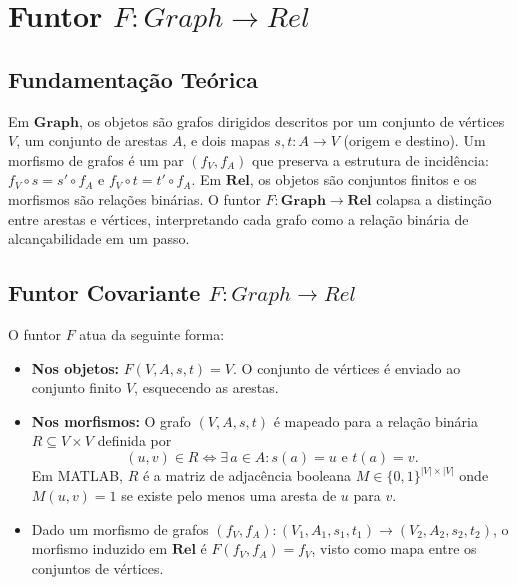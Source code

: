 \section{Funtor \texorpdfstring{$F: Graph \to Rel$}{F: Graph -> Rel}}
\label{sec:functor-graph-rel}

\subsection{Fundamentação Teórica}

Em $\mathbf{Graph}$, os objetos são grafos dirigidos descritos por um conjunto de vértices $V$, um conjunto de arestas $A$, e dois mapas $s, t: A \to V$ (origem e destino). Um morfismo de grafos é um par $(f_V, f_A)$ que preserva a estrutura de incidência: $f_V \circ s = s' \circ f_A$ e $f_V \circ t = t' \circ f_A$. Em $\mathbf{Rel}$, os objetos são conjuntos finitos e os morfismos são relações binárias. O funtor $F: \mathbf{Graph} \to \mathbf{Rel}$ colapsa a distinção entre arestas e vértices, interpretando cada grafo como a relação binária de alcançabilidade em um passo.

\subsection{Funtor Covariante \texorpdfstring{$F: Graph \to Rel$}{F: Graph -> Rel}}

\begin{definition}
O funtor $F$ atua da seguinte forma:
\begin{itemize}
    \item \textbf{Nos objetos:} $F(V, A, s, t) = V$. O conjunto de vértices é enviado ao conjunto finito $V$, esquecendo as arestas.
    \item \textbf{Nos morfismos:} O grafo $(V, A, s, t)$ é mapeado para a relação binária $R \subseteq V \times V$ definida por
    \[
        (u, v) \in R \iff \exists\, a \in A : s(a) = u \text{ e } t(a) = v.
    \]
    Em MATLAB, $R$ é a matriz de adjacência booleana $M \in \{0,1\}^{|V| \times |V|}$ onde $M(u, v) = 1$ se existe pelo menos uma aresta de $u$ para $v$.
    \item Dado um morfismo de grafos $(f_V, f_A): (V_1, A_1, s_1, t_1) \to (V_2, A_2, s_2, t_2)$, o morfismo induzido em $\mathbf{Rel}$ é $F(f_V, f_A) = f_V$, visto como mapa entre os conjuntos de vértices.
\end{itemize}
\end{definition}

